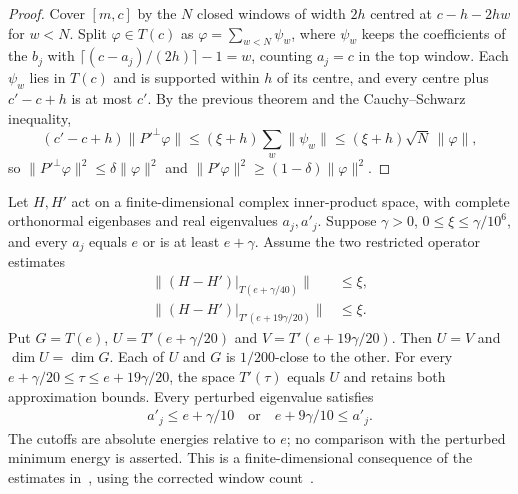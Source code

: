 \begin{proof}
    \leanok
    Cover $[m,c]$ by the $N$ closed windows of width $2h$ centred at
    $c-h-2hw$ for $w<N$. Split $\varphi\in T(c)$ as
    $\varphi=\sum_{w<N}\psi_w$, where $\psi_w$ keeps the coefficients of the
    $b_j$ with $\lceil(c-a_j)/(2h)\rceil-1=w$, counting $a_j=c$ in the top
    window. Each $\psi_w$ lies in $T(c)$ and is supported within $h$ of its
    centre, and every centre plus $c'-c+h$ is at most $c'$. By the previous
    theorem and the Cauchy--Schwarz inequality,
    \[
        (c'-c+h)\|P'^\perp\varphi\|\le(\xi+h)\sum_w\|\psi_w\|
        \le(\xi+h)\sqrt{N}\,\|\varphi\|,
    \]
    so $\|P'^\perp\varphi\|^2\le\delta\|\varphi\|^2$ and
    $\|P'\varphi\|^2\ge(1-\delta)\|\varphi\|^2$.
\end{proof}

\begin{theorem}
    \label{thm:low_spectral_cluster_restricted_residuals}
    \leanok
    Let $H,H'$ act on a finite-dimensional complex inner-product space,
    with complete orthonormal eigenbases and real eigenvalues $a_j,a'_j$.
    Suppose $\gamma>0$, $0\le\xi\le\gamma/10^6$, and every $a_j$ equals
    $e$ or is at least $e+\gamma$. Assume the two restricted operator
    estimates
    \begin{align}
        \bigl\|(H-H')|_{T(e+\gamma/40)}\bigr\|    & \le\xi,
        \label{eq:low_cluster_original_residual}            \\
        \bigl\|(H-H')|_{T'(e+19\gamma/20)}\bigr\| & \le\xi.
        \label{eq:low_cluster_perturbed_residual}
    \end{align}
    Put $G=T(e)$, $U=T'(e+\gamma/20)$ and $V=T'(e+19\gamma/20)$.
    Then $U=V$ and $\dim U=\dim G$. Each of $U$ and $G$ is
    $1/200$-close to the other. For every
    $e+\gamma/20\le\tau\le e+19\gamma/20$, the space $T'(\tau)$ equals
    $U$ and retains both approximation bounds. Every perturbed eigenvalue
    satisfies
    \begin{align}
        a'_j\le e+\gamma/10
        \quad\text{or}\quad e+9\gamma/10\le a'_j.
        \label{eq:low_cluster_eigenvalue_gap}
    \end{align}
    The cutoffs are absolute energies relative to $e$; no comparison
    with the perturbed minimum energy is asserted. This is a
    finite-dimensional consequence of the estimates
    in~\cite[lines 955--968 and 1010--1024]{Arad2016RigorousRG}, using the
    corrected window count~\cite{gap:alvv16_hard_truncation_windows}.
\end{theorem}

